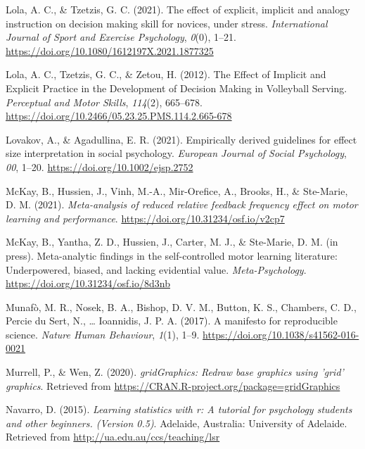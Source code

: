 \documentclass[
  english,
  man, donotrepeattitle,floatsintext]{apa7}
\newlength{\cslhangindent}
\newlength{\cslentryspacingunit} %
\newenvironment{CSLReferences}[2] %
 {%
  \setlength{\parindent}{0pt}
  \ifodd #1
  \let\oldpar\par
  \def\par{\hangindent=\cslhangindent\oldpar}
  \fi
  \setlength{\parskip}{#2\cslentryspacingunit}
 }%
 {}
\begin{document}
\begin{CSLReferences}{1}{0}
\leavevmode{}%
Lola, A. C., \& Tzetzis, G. C. (2021). The effect of explicit, implicit and analogy instruction on decision making skill for novices, under stress. \emph{International Journal of Sport and Exercise Psychology}, \emph{0}(0), 1--21. \url{https://doi.org/10.1080/1612197X.2021.1877325}

\leavevmode{}%
Lola, A. C., Tzetzis, G. C., \& Zetou, H. (2012). The Effect of Implicit and Explicit Practice in the Development of Decision Making in Volleyball Serving. \emph{Perceptual and Motor Skills}, \emph{114}(2), 665--678. \url{https://doi.org/10.2466/05.23.25.PMS.114.2.665-678}

\leavevmode{}%
Lovakov, A., \& Agadullina, E. R. (2021). Empirically derived guidelines for effect size interpretation in social psychology. \emph{European Journal of Social Psychology}, \emph{00}, 1--20. \url{https://doi.org/10.1002/ejsp.2752}

\leavevmode{}%
McKay, B., Hussien, J., Vinh, M.-A., Mir-Orefice, A., Brooks, H., \& Ste-Marie, D. M. (2021). \emph{Meta-analysis of reduced relative feedback frequency effect on motor learning and performance}. \url{https://doi.org/10.31234/osf.io/v2cp7}

\leavevmode{}%
McKay, B., Yantha, Z. D., Hussien, J., Carter, M. J., \& Ste-Marie, D. M. (in press). Meta-analytic findings in the self-controlled motor learning literature: Underpowered, biased, and lacking evidential value. \emph{Meta-Psychology}. \url{https://doi.org/10.31234/osf.io/8d3nb}

\leavevmode{}%
Munafò, M. R., Nosek, B. A., Bishop, D. V. M., Button, K. S., Chambers, C. D., Percie du Sert, N., \ldots{} Ioannidis, J. P. A. (2017). A manifesto for reproducible science. \emph{Nature Human Behaviour}, \emph{1}(1), 1--9. \url{https://doi.org/10.1038/s41562-016-0021}

\leavevmode{}%
Murrell, P., \& Wen, Z. (2020). \emph{gridGraphics: Redraw base graphics using 'grid' graphics}. Retrieved from \url{https://CRAN.R-project.org/package=gridGraphics}

\leavevmode{}%
Navarro, D. (2015). \emph{Learning statistics with r: A tutorial for psychology students and other beginners. (Version 0.5)}. Adelaide, Australia: University of Adelaide. Retrieved from \url{http://ua.edu.au/ccs/teaching/lsr}


\end{CSLReferences}
\end{document}
